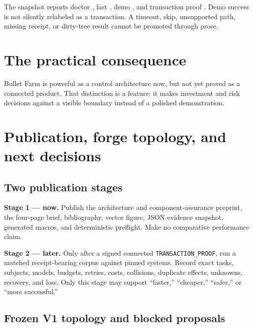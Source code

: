\documentclass[11pt,letterpaper]{article}
\begin{document}
The snapshot reports doctor \EvidenceDoctorOutcome, fast
\EvidenceFastOutcome, demo \EvidenceDemoOutcome, and transaction proof
\EvidenceTransactionOutcome. Demo success is not silently relabeled as a
transaction. A timeout, skip, unsupported path, missing receipt, or dirty-tree
result cannot be promoted through prose.

\section*{The practical consequence}

Bullet Farm is powerful as a control architecture now, but not yet proved as a
connected product. That distinction is a feature: it makes investment and risk
decisions against a visible boundary instead of a polished demonstration.

\newpage
\section*{Publication, forge topology, and next decisions}

\subsection*{Two publication stages}

\textbf{Stage 1 --- now.} Publish the architecture and component-assurance
preprint, the four-page brief, bibliography, vector figure, JSON evidence
snapshot, generated macros, and deterministic preflight. Make no comparative
performance claim.

\textbf{Stage 2 --- later.} Only after a signed connected
\texttt{TRANSACTION\_PROOF}, run a matched receipt-bearing corpus against pinned
systems. Record exact tasks, subjects, models, budgets, retries, costs,
collisions, duplicate effects, unknowns, recovery, and loss. Only this stage
may support ``faster,'' ``cheaper,'' ``safer,'' or ``more successful.''

\subsection*{Frozen V1 topology and blocked proposals}
\end{document}
